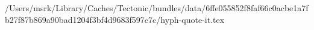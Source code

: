 /Users/msrk/Library/Caches/Tectonic/bundles/data/6ffe055852f8faf66c0acbe1a7fb27f87b869a90bad1204f3bf4d9683f597c7c/hyph-quote-it.tex